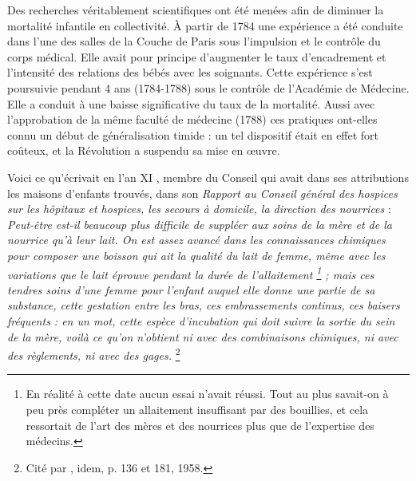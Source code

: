  Des recherches véritablement scientifiques ont été menées afin de diminuer la mortalité infantile en collectivité. À partir de 1784 une expérience a été conduite dans l'une des salles de la Couche de Paris sous l'impulsion et le contrôle du corps médical. Elle avait pour principe d'augmenter le taux d'encadrement et l'intensité des relations des bébés avec les soignants. Cette expérience s'est poursuivie pendant 4 ans (1784-1788) sous le contrôle de l'Académie de Médecine. Elle a conduit à une baisse significative du taux de la mortalité. Aussi avec l'approbation de la même faculté de médecine (1788) ces pratiques ont-elles connu un début de généralisation timide : un tel dispositif était en effet fort coûteux, et la Révolution a suspendu sa mise en œuvre.

 Voici ce qu'écrivait en l'an XI , membre du Conseil qui avait dans ses attributions les maisons d'enfants trouvés, dans son \emph{Rapport au Conseil général des hospices sur les hôpitaux et hospices, les secours à domicile, la direction des nourrices} : \emph{Peut-être est-il beaucoup plus difficile de suppléer aux soins de la mère et de la nourrice qu'à leur lait. On est assez avancé dans les connaissances chimiques pour composer une boisson qui ait la qualité du lait de femme, même avec les variations que le lait éprouve pendant la durée de l'allaitement%
\footnote{En réalité à cette date aucun essai n'avait réussi. Tout au plus savait-on à peu près compléter un allaitement insuffisant par des bouillies, et cela ressortait de l'art des mères et des nourrices plus que de l'expertise des médecins.} 
; mais ces tendres soins d'une femme pour l'enfant auquel elle donne une partie de sa substance, cette gestation entre les bras, ces embrassements continus, ces baisers fréquents : en un mot, cette espèce d'incubation qui doit suivre la sortie du sein de la mère, voilà ce qu'on n'obtient ni avec des combinaisons chimiques, ni avec des règlements, ni avec des gages.}%
\footnote{Cité par , idem, p. 136 et 181, 1958.} 


